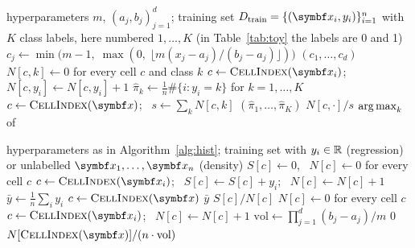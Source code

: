 \documentclass[11pt]{article}
\begin{document}
\begin{algorithm}[H]
\caption{Histogram classifier with $m$ bins per axis on the box $[a_1, b_1] \times \dots \times [a_d, b_d]$}
\label{alg:hist}
\small
\begin{algorithmic}[1]
\Require hyperparameters $m$, $(a_j, b_j)_{j=1}^d$; training set $\Dtrain = \{(\x_i, y_i)\}_{i=1}^n$ with $K$ class labels, here numbered $1, \dots, K$ (in Table~\ref{tab:toy} the labels are 0 and 1)
    \State $c_j \gets \min\big(m - 1,\; \max(0,\; \lfloor m (x_j - a_j)/(b_j - a_j) \rfloor)\big)$ 
  \EndFor
  \State \Return $(c_1, \dots, c_d)$
\EndFunction
{}
  \State $N[c, k] \gets 0$ for every cell $c$ and class $k$ 
    \State $c \gets \Call{CellIndex}{\x_i}$; \ $N[c, y_i] \gets N[c, y_i] + 1$
  \EndFor
  \State $\hat\pi_k \gets \frac{1}{n}\#\{i : y_i = k\}$ for $k = 1, \dots, K$ 
\EndFunction
{} 
  \State $c \gets \Call{CellIndex}{\x}$; \ $s \gets \sum_{k} N[c, k]$
   \Return $(\hat\pi_1, \dots, \hat\pi_K)$  \EndIf
  \State \Return $N[c, \cdot] / s$
\EndFunction
{}
  \State \Return $\operatorname*{arg\,max}_k$ of  
\EndFunction
\end{algorithmic}
\end{algorithm}

\begin{algorithm}[H]
\caption{Histogram regression (\textsc{Reg}) and density estimation (\textsc{Dens}); both use \textsc{CellIndex} of Algorithm~\ref{alg:hist}}
\label{alg:histreg}
\small
\begin{algorithmic}[1]
\Require hyperparameters as in Algorithm~\ref{alg:hist}; training set with $y_i \in \mathbb{R}$ (regression) or unlabelled $\x_1, \dots, \x_n$ (density)
  \State $S[c] \gets 0$, \ $N[c] \gets 0$ for every cell $c$ 
    \State $c \gets \Call{CellIndex}{\x_i}$; \ $S[c] \gets S[c] + y_i$; \ $N[c] \gets N[c] + 1$
  \EndFor
  \State $\bar y \gets \frac{1}{n} \sum_i y_i$ 
\EndFunction
{}
  \State $c \gets \Call{CellIndex}{\x}$
   \Return $\bar y$ \EndIf
  \State \Return $S[c] / N[c]$ 
\EndFunction
{}
  \State $N[c] \gets 0$ for every cell $c$
    \State $c \gets \Call{CellIndex}{\x_i}$; \ $N[c] \gets N[c] + 1$
  \EndFor
  \State $\mathrm{vol} \gets \prod_{j=1}^d (b_j - a_j)/m$ 
\EndFunction
{}
   \Return $0$ \EndIf
  \State \Return $N[\Call{CellIndex}{\x}] / (n \cdot \mathrm{vol})$
\EndFunction
\end{algorithmic}
\end{algorithm}
\end{document}
